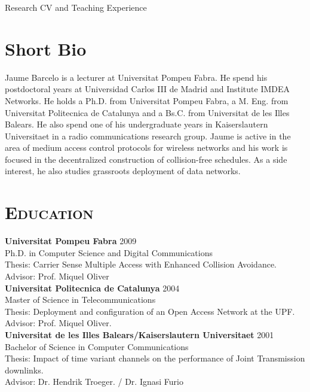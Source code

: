 \documentclass[line,margin]{res}
\begin{document}
 




%

 

\newpage
\begin{resume}
{\huge Research CV and Teaching Experience}

\section{Short Bio}
      Jaume Barcelo is a lecturer at Universitat Pompeu Fabra. He spend his postdoctoral years at Universidad Carlos III de Madrid and Institute IMDEA Networks. He holds a Ph.D. from Universitat Pompeu Fabra, a M. Eng. from Universitat Politecnica de Catalunya and a Bs.C. from Universitat de les Illes Balears. He also spend one of his undergraduate years in Kaiserslautern Universitaet in a radio communications research group. Jaume is active in the area of medium access control protocols for wireless networks and his work is focused in the decentralized construction of collision-free schedules. As a side interest, he also studies grassroots deployment of data networks.

\section{\textsc{Education}} 
\textbf{Universitat Pompeu Fabra} \hfill 2009 \\
Ph.D. in Computer Science and Digital Communications \\
 Thesis: Carrier Sense Multiple Access with Enhanced Collision Avoidance. \\
 Advisor: Prof. Miquel Oliver\\
\textbf{Universitat Politecnica de Catalunya} \hfill 2004 \\ 
Master of Science in Telecommunications \\
 Thesis: Deployment and configuration of an Open Access Network at the UPF. \\
 Advisor: Prof. Miquel Oliver.\\
\textbf{Universitat de les Illes Balears/Kaiserslautern Universitaet} \hfill 2001 \\ 
Bachelor of Science in Computer Communications \\
Thesis: Impact of time variant channels on the performance of Joint Transmission downlinks.\\
Advisor: Dr. Hendrik Troeger. / Dr. Ignasi Furio \\


\end{resume}
\end{document}
